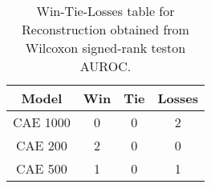 \begin{table}[H]
\centering
\begin{tabular}{|c|c|c|c|}

\textbf{Model} &  \textbf{Win} &  \textbf{Tie} &  \textbf{Losses} \\
\hline

      CAE 1000 &             0 &             0 &                2 \\
\hline
       CAE 200 &             2 &             0 &                0 \\
\hline
       CAE 500 &             1 &             0 &                1 \\
\hline

\end{tabular}
\caption{Win-Tie-Losses table for Reconstruction obtained from Wilcoxon signed-rank teston AUROC.}
\label{tab:reconstruction_model_comparison}
\end{table}